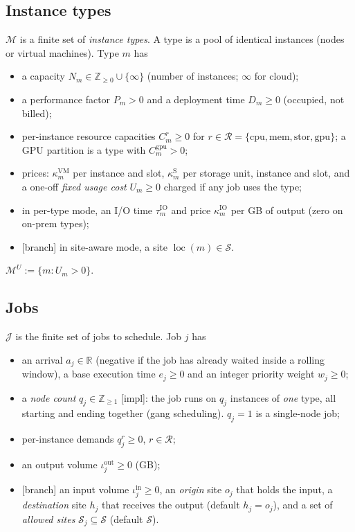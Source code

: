 \documentclass[11pt,a4paper]{article}
\theoremstyle{definition}
\theoremstyle{remark}
\newcommand{\J}{\mathcal{J}}
\newcommand{\M}{\mathcal{M}}
\newcommand{\Sites}{\mathcal{S}}
\newcommand{\Res}{\mathcal{R}}
\newcommand{\MU}{\M^{U}}
\newcommand{\Z}{\mathbb{Z}}
\newcommand{\R}{\mathbb{R}}
\newcommand{\loc}{\operatorname{loc}}
\newcommand{\pin}{\mathrm{in}}
\newcommand{\pout}{\mathrm{out}}
\newcommand{\status}[1]{\textsf{\small[#1]}}
\begin{document}
\subsection{Instance types}
$\M$ is a finite set of \emph{instance types}. A type is a pool of identical
instances (nodes or virtual machines). Type $m$ has
\begin{itemize}[nosep,leftmargin=*]
\item a capacity $N_m\in\Z_{\ge0}\cup\{\infty\}$ (number of instances; $\infty$
  for cloud);
\item a performance factor $P_m>0$ and a deployment time $D_m\ge0$ (occupied,
  not billed);
\item per-instance resource capacities $C^r_m\ge0$ for
  $r\in\Res=\{\mathrm{cpu},\mathrm{mem},\mathrm{stor},\mathrm{gpu}\}$; a GPU
  partition is a type with $C^{\mathrm{gpu}}_m>0$;
\item prices: $\kappa^{\mathrm{VM}}_m$ per instance and slot,
  $\kappa^{\mathrm S}_m$ per storage unit, instance and slot, and a one-off
  \emph{fixed usage cost} $U_m\ge0$ charged if any job uses the type;
\item in per-type mode, an I/O time $\tau^{\mathrm{IO}}_m$ and price
  $\kappa^{\mathrm{IO}}_m$ per GB of output (zero on on-prem types);
\item \status{branch} in site-aware mode, a site $\loc(m)\in\Sites$.
\end{itemize}
$\MU:=\{m:U_m>0\}$.

\subsection{Jobs}
$\J$ is the finite set of jobs to schedule. Job $j$ has
\begin{itemize}[nosep,leftmargin=*]
\item an arrival $a_j\in\R$ (negative if the job has already waited inside a
  rolling window), a base execution time $e_j\ge0$ and an integer priority
  weight $w_j\ge0$;
\item a \emph{node count} $q_j\in\Z_{\ge1}$ \status{impl}: the job runs on $q_j$
  instances of \emph{one} type, all starting and ending together (gang
  scheduling). $q_j=1$ is a single-node job;
\item per-instance demands $q^r_j\ge0$, $r\in\Res$;
\item an output volume $\iota^\pout_j\ge0$ (GB);
\item \status{branch} an input volume $\iota^\pin_j\ge0$, an \emph{origin}
  site $o_j$ that holds the input, a \emph{destination} site $h_j$ that receives
  the output (default $h_j=o_j$), and a set of \emph{allowed sites}
  $\Sites_j\subseteq\Sites$ (default $\Sites$).
\end{itemize}
\end{document}
